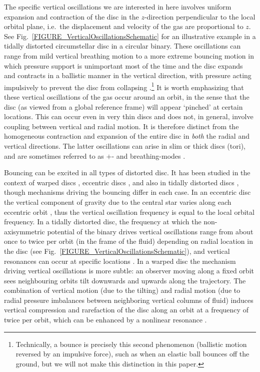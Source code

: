 \documentclass[fleqn,usenatbib]{mnras}
\begin{document}
The specific vertical oscillations we are interested in here involves uniform expansion and contraction of the disc in the $z$-direction perpendicular to the local orbital plane, i.e.\ the displacement and velocity of the gas are proportional to $z$. See Fig.~\ref{FIGURE_VerticalOscillationsSchematic} for an illustrative example in a tidally distorted circumstellar disc in a circular binary. These oscillations can range from mild vertical breathing motion \citep{ogilvie2002non, ogilvie20083d, ryu2021impact} to a more extreme bouncing motion in which pressure support is unimportant most of the time and the disc expands and contracts in a ballistic manner in the vertical direction, with pressure acting impulsively to prevent the disc from collapsing \citep{lynch2021importance, fairbairn2021non}.\footnote{Technically, a bounce is precisely this second phenomenon (ballistic motion reversed by an impulsive force), such as when an elastic ball bounces off the ground, but we will not make this distinction in this paper.} It is worth emphasizing that these vertical oscillations of the gas occur around an orbit, in the sense that the disc (as viewed from a global reference frame) will appear `pinched' at certain locations. This can occur even in very thin discs and does not, in general, involve coupling between vertical and radial motion. It is therefore distinct from the homogeneous contraction and expansion of the entire disc in \textit{both} the radial and vertical directions. The latter oscillations can arise in slim or thick discs (tori), and are sometimes referred to as $+$- and breathing-modes \citep{blaes2006oscillation}.

Bouncing can be excited in all types of distorted disc. It has been studied in the context of warped discs \citep{ogilvie2013local, fairbairn2021non}, eccentric discs \citep{ogilvie2014local,ryu2021impact,chan2023magnetorotational}, and also in tidally distorted discs \citep{stehle1999hydrodynamics, ogilvie2002tidally}, though mechanisms driving the bouncing differ in each case. In an eccentric disc the vertical component of gravity due to the central star varies along each eccentric orbit \citep{ogilvie2001,barker2014hydrodynamic}, thus the vertical oscillation frequency is equal to the local orbital frequency. In a tidally distorted disc, the frequency at which the non-axisymmetric potential of the binary drives vertical oscillations range from about once to twice per orbit (in the frame of the fluid) depending on radial location in the disc (see Fig.~\ref{FIGURE_VerticalOscillationsSchematic}), and vertical resonances can occur at specific locations \citep{lubow1981vertically}. In a warped disc the mechanism driving vertical oscillations is more subtle: an observer moving along a fixed orbit sees neighbouring orbits tilt downwards and upwards along the trajectory. The combination of vertical motion (due to the tilting) and radial motion (due to radial pressure imbalances between neighboring vertical columns of fluid) induces vertical compression and rarefaction of the disc along an orbit at a frequency of twice per orbit, which can be enhanced by a nonlinear resonance \citep{ogilvie2013local,fairbairn2021non}.
\end{document}
